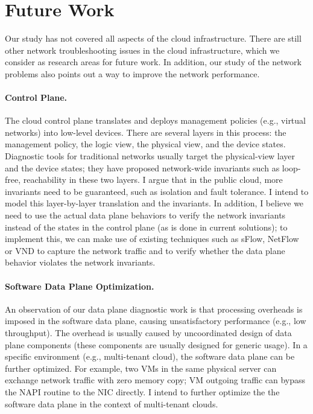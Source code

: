\section{Future Work}
Our study has not covered all aspects of the cloud infrastructure. There
are still other network troubleshooting issues in the cloud infrastructure,
which we consider as research areas for future work. In addition, our study of the 
network problems also points out a way to improve the network performance.

\paragraph{Control Plane.} The cloud control plane translates
and deploys management policies (e.g., virtual networks) into low-level devices. There are several
layers in this process: the management policy, the logic view, the physical view, and the device
states. Diagnostic tools for traditional networks usually target the physical-view layer and the
device states; they have proposed network-wide invariants such as loop-free, reachability in these
two layers. I argue that in the public cloud, more invariants need to be guaranteed, such as isolation
and fault tolerance. I intend to model this layer-by-layer translation and the invariants. In addition,
I believe we need to use the actual data plane behaviors to verify the network invariants instead of the
states in the control plane (as is done in current solutions); 
to implement this, we can make use of existing techniques such as sFlow,
NetFlow or VND to capture the network traffic and to verify whether the data plane behavior violates
the network invariants.

\paragraph{Software Data Plane Optimization.} An observation of our data plane diagnostic work 
is that processing overheads is imposed in the software data plane, causing unsatisfactory
performance (e.g., low throughput). The overhead is usually
caused by uncoordinated design of data plane components (these components are usually designed
for generic usage). In a specific environment (e.g., multi-tenant cloud), the software data plane can
be further optimized. For example, two VMs in the same physical server can exchange network
traffic with zero memory copy; VM outgoing traffic can bypass the NAPI routine to the NIC directly.
I intend to further optimize the the software data plane in the context of multi-tenant clouds.


